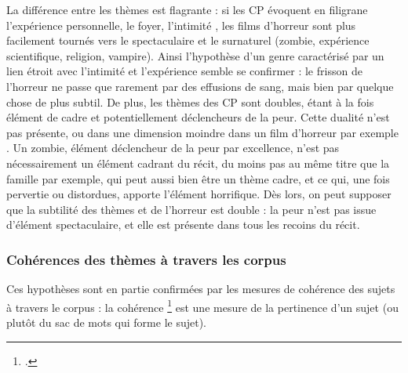 \documentclass[12pt,a4paper,oneside,titlepage]{book} %
\begin{document}
	La différence entre les thèmes est flagrante : si les CP évoquent en filigrane l'expérience personnelle, le foyer, l'intimité , les films d'horreur sont plus facilement tournés vers le spectaculaire et le surnaturel (zombie, expérience scientifique, religion, vampire). 
	Ainsi l'hypothèse d'un genre caractérisé par un lien étroit avec l'intimité et l'expérience semble se confirmer : le frisson de l'horreur ne passe que rarement par des effusions de sang, mais bien par quelque chose de plus subtil.
	De plus, les thèmes des CP sont doubles, étant à la fois élément de cadre et potentiellement déclencheurs de la peur. Cette dualité n'est pas présente, ou dans une dimension moindre dans un film d'horreur par exemple . Un zombie, élément déclencheur de la peur par excellence, n'est pas nécessairement un élément cadrant du récit, du moins pas au même titre que la famille par exemple, qui peut aussi bien être un thème cadre, et ce qui, une fois pervertie ou distordues, apporte l'élément horrifique. Dès lors, on peut supposer que la subtilité des thèmes et de l'horreur est double : la peur n'est pas issue d'élément spectaculaire, et elle est présente dans tous les recoins du récit.

\subsubsection{Cohérences des thèmes à travers les corpus}

Ces hypothèses sont en partie confirmées par les mesures de cohérence des sujets à travers le corpus : la cohérence \footcite{10.1145/2684822.2685324} est une mesure de la pertinence d'un sujet (ou plutôt du sac de mots qui forme le sujet).
\end{document}
